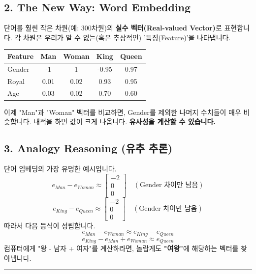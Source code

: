 \documentclass[11pt,a4paper]{book}
\theoremstyle{definition}
\begin{document}
\subsection{2. The New Way: Word Embedding}
단어를 훨씬 작은 차원(예: 300차원)의 \textbf{실수 벡터(Real-valued Vector)}로 표현합니다. 각 차원은 우리가 알 수 없는(혹은 추상적인) '특징(Feature)'을 나타냅니다.

\begin{analogybox}[title={가상의 특징표 (Featurized Representation)}]
\begin{center}
\begin{tabular}{l|c|c|c|c}
\hline
\textbf{Feature} & \textbf{Man} & \textbf{Woman} & \textbf{King} & \textbf{Queen} \\ \hline
Gender & -1 & 1 & -0.95 & 0.97 \\ 
Royal & 0.01 & 0.02 & 0.93 & 0.95 \\ 
Age & 0.03 & 0.02 & 0.70 & 0.60 \\ \hline
\end{tabular}
\end{center}
이제 "Man"과 "Woman" 벡터를 비교하면, Gender를 제외한 나머지 수치들이 매우 비슷합니다. 내적을 하면 값이 크게 나옵니다. \textbf{유사성을 계산할 수 있습니다.}
\end{analogybox}

\subsection{3. Analogy Reasoning (유추 추론)}


단어 임베딩의 가장 유명한 예시입니다.
$$ e_{Man} - e_{Woman} \approx \begin{bmatrix} -2 \\ 0 \\ 0 \end{bmatrix} \quad (\text{Gender 차이만 남음}) $$
$$ e_{King} - e_{Queen} \approx \begin{bmatrix} -2 \\ 0 \\ 0 \end{bmatrix} \quad (\text{Gender 차이만 남음}) $$
따라서 다음 등식이 성립합니다.
$$ e_{Man} - e_{Woman} \approx e_{King} - e_{Queen} $$
$$ e_{King} - e_{Man} + e_{Woman} \approx e_{Queen} $$
컴퓨터에게 "왕 - 남자 + 여자"를 계산하라면, 놀랍게도 \textbf{"여왕"}에 해당하는 벡터를 찾아냅니다.

\vspace{0.5cm}\hrule\vspace{0.5cm}
\end{document}
